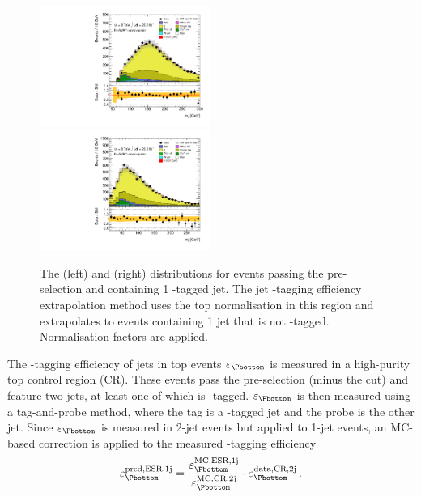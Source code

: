 \begin{figure}[t]
	\includegraphics[width=0.495\textwidth]{tex/backgrounds/emme_CutMTW_1j_noSubBjet_Btagged_MT_TrackHWW_Clj_mh125_lin}
	\hfill
	\includegraphics[width=0.495\textwidth]{tex/backgrounds/emme_CutMTW_1j_noSubBjet_Btagged_Mll_mh125_lin}
	\caption{The \mt (left) and \mll (right) distributions for events passing the 
	pre-selection and containing 1 \Pbottom-tagged jet. The jet \Pbottom-tagging 
	efficiency extrapolation method uses the top normalisation in this region and 
	extrapolates to events containing 1 jet that is not \Pbottom-tagged. Normalisation 
	factors are applied.}
	\label{fig:top:jbee}
\end{figure}

The \Pbottom-tagging efficiency of jets in top events $\varepsilon_{\Pbottom}$ is measured 
in a high-purity top control region (CR). These events pass the pre-selection (minus the 
\corrtrackmet cut) and feature two jets, at least one of which is \Pbottom-tagged. 
$\varepsilon_{\Pbottom}$ is then measured using a tag-and-probe method, where the tag is a 
\Pbottom-tagged jet and the probe is the other jet. Since $\varepsilon_{\Pbottom}$ is 
measured in 2-jet events but applied to 1-jet events, an MC-based correction is applied to 
the measured \Pbottom-tagging efficiency
\begin{equation}
	\varepsilon_{\Pbottom}^{\text{pred,ESR,1j}} = \frac{\varepsilon_{\Pbottom}^{\text{MC,ESR,1j}}}{\varepsilon_{\Pbottom}^{\text{MC,CR,2j}}} \cdot \varepsilon_{\Pbottom}^{\text{data,CR,2j}} \,.
	\label{eq:top:jbee}
\end{equation}

